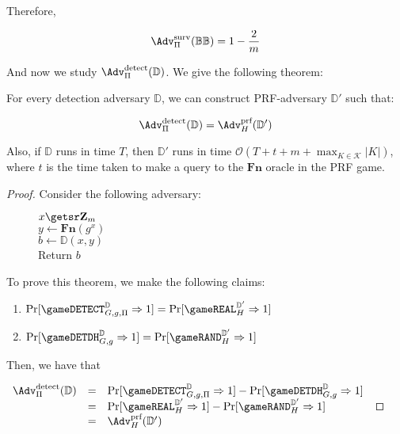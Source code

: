 Therefore, 

$$\Adv^{\text{surv}}_\Pi(\mathbb{BB})=1-\frac{2}{m}$$

And now we study $\Adv^{\text{detect}}_\Pi(\mathbb{D})$. We give the following theorem:

\begin{theorem}
For every detection adversary $\mathbb{D}$, we can construct PRF-adversary $\mathbb{D}'$ such that: 

$$\Adv^{\text{detect}}_\Pi(\mathbb{D})=\Adv^{\text{prf}}_H(\mathbb{D'})$$

Also, if $\mathbb{D}$ runs in time $T$, then $\mathbb{D}'$ runs in time $\mathcal{O}(T+t+m+\max_{K\in\mathcal{K}}|K|)$, where $t$ is the time taken to make a query to the $\mathbf{Fn}$ oracle in the PRF game.
\end{theorem}
\pagebreak
\begin{proof}
Consider the following adversary: 

\begin{figure}[h]
{
$x\getsr \mathbf{Z}_m$\\
$y\gets \mathbf{Fn}(g^x)$\\
$b\gets \mathbb{D}(x,y)$\\
Return $b$
}
\vspace{-1ex}
\label{fig-attack}
\end{figure}

To prove this theorem, we make the following claims: 

\begin{enumerate}
\item $\Pr[\gameDETECT_{G,g,\Pi}^{\mathbb{D}}\Rightarrow 1] = \Pr[\gameREAL_H^{\mathbb{D'}}\Rightarrow 1]$
\item $\Pr[\gameDETDH_{G,g}^{\mathbb{D}}\Rightarrow 1] = \Pr[\gameRAND_H^{\mathbb{D'}}\Rightarrow 1]$
\end{enumerate}

Then, we have that 

\begin{math}
\begin{array}{lllllllll}
\Adv^{\text{detect}}_\Pi(\mathbb{D})&=&\Pr[\gameDETECT_{G,g,\Pi}^{\mathbb{D}}\Rightarrow 1] - \Pr[\gameDETDH_{G,g}^{\mathbb{D}}\Rightarrow 1]\\
&=&\Pr[\gameREAL_H^{\mathbb{D'}}\Rightarrow 1] - \Pr[\gameRAND_H^{\mathbb{D'}}\Rightarrow 1]\\
&=&\Adv^{\text{prf}}_H(\mathbb{D}')\
\end{array}
\end{math} 


\end{proof}
